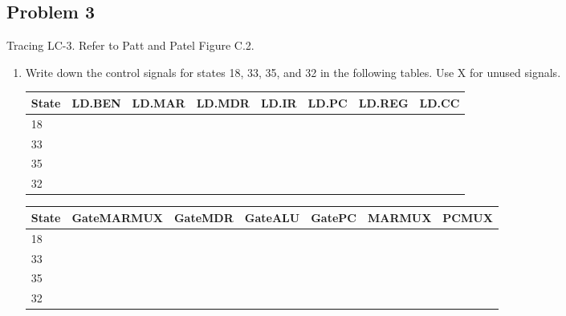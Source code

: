 \documentclass{article}
\begin{document}
\subsection*{Problem 3}
Tracing LC-3. Refer to Patt and Patel Figure C.2.
\begin{enumerate}[label=\alph*]
\item Write down the control signals for states 18, 33, 35, and 32 in the following tables. Use X for unused signals.

\begin{table}[!h]
\begin{tabular}{|l|l|l|l|l|l|l|l|}
\hline
\textbf{State} & \textbf{LD.BEN} & \textbf{LD.MAR} & \textbf{LD.MDR} & \textbf{LD.IR} & \textbf{LD.PC} & \textbf{LD.REG} & \textbf{LD.CC} \\ \hline
18             &                 &                 &                 &                &                &                 &                \\ \hline
33             &                 &                 &                 &                &                &                 &                \\ \hline
35             &                 &                 &                 &                &                &                 &                \\ \hline
32             &                 &                 &                 &                &                &                 &                \\ \hline
\end{tabular}
\end{table}
\begin{table}[!h]
\begin{tabular}{|l|l|l|l|l|l|l|}
\hline
\textbf{State} & \textbf{GateMARMUX} & \textbf{GateMDR} & \textbf{GateALU} & \textbf{GatePC} & \textbf{MARMUX} & \textbf{PCMUX} \\ \hline
18             &                     &                  &                  &                 &                 &                \\ \hline
33             &                     &                  &                  &                 &                 &                \\ \hline
35             &                     &                  &                  &                 &                 &                \\ \hline
32             &                     &                  &                  &                 &                 &                \\ \hline

\end{tabular}
\end{table}
\end{enumerate}
\end{document}

